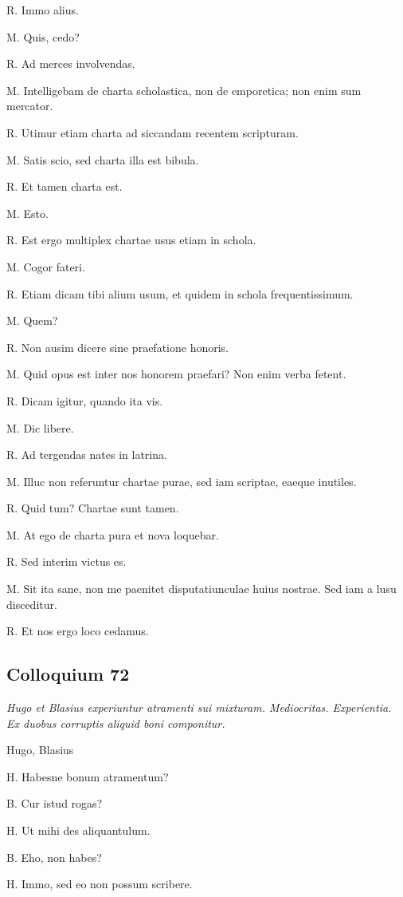 \documentclass{article}
\begin{document}
R. Immo alius. 

M. Quis, cedo?

R. Ad merces involvendas. 

M. Intelligebam de charta scholastica, non de emporetica; non enim sum mercator. 

R. Utimur etiam charta ad siccandam recentem scripturam. 

M. Satis scio, sed charta illa est bibula. 

R. Et tamen charta est. 

M. Esto. 

R. Est ergo multiplex chartae usus etiam in schola. 

M. Cogor fateri. 

R. Etiam dicam tibi alium usum, et quidem in schola frequentissimum. 

M. Quem?

R. Non ausim dicere sine praefatione honoris. 

M. Quid opus est inter nos honorem praefari? Non enim verba fetent. 

R. Dicam igitur, quando ita vis. 

M. Dic libere. 

R. Ad tergendas nates in latrina. 

M. Illuc non referuntur chartae purae, sed iam scriptae, eaeque inutiles. 

R. Quid tum? Chartae sunt tamen. 

M. At ego de charta pura et nova loquebar. 

R. Sed interim victus es. 

M. Sit ita sane, non me paenitet disputatiunculae huius nostrae. Sed iam a lusu disceditur. 

R. Et nos ergo loco cedamus. 

\subsection{Colloquium 72}
\emph{Hugo et Blasius experiuntur atramenti sui mixturam. Mediocritas. Experientia. Ex duobus corruptis aliquid boni componitur.}

Hugo, Blasius

H. Habesne bonum atramentum?

B. Cur istud rogas?

H. Ut mihi des aliquantulum. 

B. Eho, non habes?

H. Immo, sed eo non possum scribere. 
\end{document}
